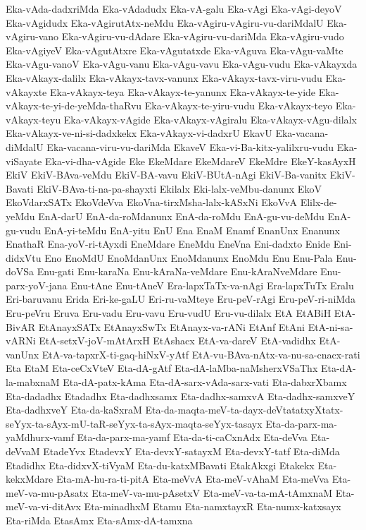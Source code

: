 {Eka-vAda-dadxriMda
Eka-vAdadudx
Eka-vA-galu
Eka-vAgi
Eka-vAgi-deyoV
Eka-vAgidudx
Eka-vAgirutAtx-neMdu
Eka-vAgiru-vAgiru-vu-dariMdalU
Eka-vAgiru-vano
Eka-vAgiru-vu-dAdare
Eka-vAgiru-vu-dariMda
Eka-vAgiru-vudo
Eka-vAgiyeV
Eka-vAgutAtxre
Eka-vAgutatxde
Eka-vAguva
Eka-vAgu-vaMte
Eka-vAgu-vanoV
Eka-vAgu-vanu
Eka-vAgu-vavu
Eka-vAgu-vudu
Eka-vAkayxda
Eka-vAkayx-dalilx
Eka-vAkayx-tavx-vanunx
Eka-vAkayx-tavx-viru-vudu
Eka-vAkayxte
Eka-vAkayx-teya
Eka-vAkayx-te-yanunx
Eka-vAkayx-te-yide
Eka-vAkayx-te-yi-de-yeMda-thaRvu
Eka-vAkayx-te-yiru-vudu
Eka-vAkayx-teyo
Eka-vAkayx-teyu
Eka-vAkayx-vAgide
Eka-vAkayx-vAgiralu
Eka-vAkayx-vAgu-dilalx
Eka-vAkayx-ve-ni-si-dadxkekx
Eka-vAkayx-vi-dadxrU
EkavU
Eka-vacana-diMdalU
Eka-vacana-viru-vu-dariMda
EkaveV
Eka-vi-Ba-kitx-yalilxru-vudu
Eka-viSayate
Eka-vi-dha-vAgide
Eke
EkeMdare
EkeMdareV
EkeMdre
EkeY-kasAyxH
EkiV
EkiV-BAva-veMdu
EkiV-BA-vavu
EkiV-BUtA-nAgi
EkiV-Ba-vanitx
EkiV-Bavati
EkiV-BAva-ti-na-pa-shayxti
Ekilalx
Eki-lalx-veMbu-danunx
EkoV
EkoVdarxSATx
EkoVdeVva
EkoVna-tirxMsha-lalx-kASxNi
EkoVvA
Elilx-de-yeMdu
EnA-darU
EnA-da-roMdanunx
EnA-da-roMdu
EnA-gu-vu-deMdu
EnA-gu-vudu
EnA-yi-teMdu
EnA-yitu
EnU
Ena
EnaM
Enamf
EnanUnx
Enanunx
EnathaR
Ena-yoV-ri-tAyxdi
EneMdare
EneMdu
EneVna
Eni-dadxto
Enide
Eni-didxVtu
Eno
EnoMdU
EnoMdanUnx
EnoMdanunx
EnoMdu
Enu
Enu-Pala
Enu-doVSa
Enu-gati
Enu-karaNa
Enu-kAraNa-veMdare
Enu-kAraNveMdare
Enu-parx-yoV-jana
Enu-tAne
Enu-tAneV
Era-lapxTaTx-va-nAgi
Era-lapxTuTx
Eralu
Eri-baruvanu
Erida
Eri-ke-gaLU
Eri-ru-vaMteye
Eru-peV-rAgi
Eru-peV-ri-niMda
Eru-peVru
Eruva
Eru-vadu
Eru-vavu
Eru-vudU
Eru-vu-dilalx
EtA
EtABiH
EtA-BivAR
EtAnayxSATx
EtAnayxSwTx
EtAnayx-va-rANi
EtAnf
EtAni
EtA-ni-sa-vARNi
EtA-setxV-joV-mAtArxH
EtAshacx
EtA-va-dareV
EtA-vadidhx
EtA-vanUnx
EtA-va-tapxrX-ti-gaq-hiNxV-yAtf
EtA-vu-BAva-nAtx-va-nu-sa-cnacx-rati
Eta
EtaM
Eta-ceCxVteV
Eta-dA-gAtf
Eta-dA-laMba-naMsherxVSaThx
Eta-dA-la-mabxnaM
Eta-dA-patx-kAma
Eta-dA-sarx-vAda-sarx-vati
Eta-dabxrXbamx
Eta-dadadhx
Etadadhx
Eta-dadhxsamx
Eta-dadhx-samxvA
Eta-dadhx-samxveY
Eta-dadhxveY
Eta-da-kaSxraM
Eta-da-maqta-meV-ta-dayx-deVtatatxyXtatx-seYyx-ta-sAyx-mU-taR-seYyx-ta-sAyx-maqta-seYyx-tasayx
Eta-da-parx-ma-yaMdhurx-vamf
Eta-da-parx-ma-yamf
Eta-da-ti-caCxnAdx
Eta-deVva
Eta-deVvaM
EtadeYvx
EtadevxY
Eta-devxY-satayxM
Eta-devxY-tatf
Eta-diMda
Etadidhx
Eta-didxvX-tiVyaM
Eta-du-katxMBavati
EtakAkxgi
Etakekx
Eta-kekxMdare
Eta-mA-hu-ra-ti-pitA
Eta-meVvA
Eta-meV-vAhaM
Eta-meVva
Eta-meV-va-mu-pAsatx
Eta-meV-va-mu-pAsetxV
Eta-meV-va-ta-mA-tAmxnaM
Eta-meV-va-vi-ditAvx
Eta-minadhxM
Etamu
Eta-namxtayxR
Eta-numx-katxsayx
Eta-riMda
EtasAmx
Eta-sAmx-dA-tamxna
}
